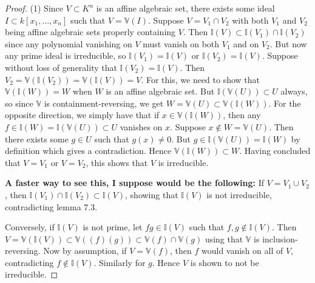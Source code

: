 \documentclass[reqno]{amsart}
\theoremstyle{definition}
\theoremstyle{remark}
\begin{document}
    \begin{proof}
        (1) Since $V \subset K^{n}$ is an affine
        algebraic set, there exists
        some ideal $I \subset k\left[ x_1, \ldots,
        x_n\right] $ such that
        $V = \mathbb{V}(I)$.
        Suppose
        $V = V_1 \cap V_2$ with
        both $V_1$ and $V_2$ being affine
        algebraic sets properly containing
        $V$.
        Then
        $\mathbb{I}(V) \subset 
        \mathbb{I}(V_1) \cap \mathbb{I}(V_2)$ since
        any polynomial vanishing on $V$ must vanish on
        both $V_1$ and on $V_2$. But now any
        prime ideal is irreducible, so
        $\mathbb{I}(V_1) = \mathbb{I}(V)$  or
        $\mathbb{I}(V_2) = \mathbb{I}(V)$.
        Suppose without loss
        of generality that
        $\mathbb{I}(V_2) = \mathbb{I}(V)$. Then
        $V_2 = \mathbb{V} (\mathbb{I}(V_2)) = 
        \mathbb{V} (\mathbb{I}(V)) = V$.
        For this, we need to show that
        $\mathbb{V} \left( \mathbb{I} (W) \right) 
        = W$ when $W$ is an affine algebraic set.
        But $\mathbb{I} \left( \mathbb{V}(U) \right) 
        \subset U$ always, so since
        $\mathbb{V}$ is containment-reversing, we get
        $W = \mathbb{V}(U) \subset 
        \mathbb{V} \left( \mathbb{I} (W) \right) $.
        For the opposite direction, we simply have
        that if
        $x \in \mathbb{V} \left( \mathbb{I}(W) \right) $, then
        any $f \in \mathbb{I}(W)
        = \mathbb{I}\left( \mathbb{V}(U) \right)
        \subset U$ vanishes on
        $x$. Suppose
        $x \not\in W = \mathbb{V}(U)$.
        Then there exists some $g \in U$ such that
        $g(x) \neq 0$. But 
        $g \in \mathbb{I} \left( \mathbb{V}
        (U) \right) = \mathbb{I}(W)$ by definition
        which gives a contradiction.
        Hence
        $\mathbb{V}\left( \mathbb{I}(W) \right) 
        \subset W$.
        Having concluded that
        $V = V_1$ or $V = V_2$, this shows that
        $V$ is irreducible.\\
        \linebreak

        \textbf{A faster way to see this, I suppose
        would be the following:}
        If $V = V_1 \cup  V_2$, then
        $\mathbb{I}(V_1) \cap
        \mathbb{I}(V_2) \subset 
        \mathbb{I}(V)$, showing that 
        $\mathbb{I}(V)$ is not irreducible, contradicting
        lemma 7.3.\\
        \linebreak
        
        Conversely, if
        $\mathbb{I}(V)$ is not prime, let
        $fg \in \mathbb{I}(V)$ such that
        $f,g \not\in \mathbb{I}(V)$.
        Then
        $V = 
        \mathbb{V} \left( \mathbb{I}(V) \right) 
        \subset \mathbb{V}
        \left( (f) (g) \right) 
        \subset \mathbb{V}(f) \cap
        \mathbb{V}(g)$ using that
        $\mathbb{V}$ is inclusion-reversing. 
        Now by assumption,
        if $V = \mathbb{V}(f)$, then
        $f$ would vanish on all of $V$, contradicting
        $f \not\in \mathbb{I}(V)$. Similarly for
        $g$. Hence
        $V$ is shown to not be irreducible.






\end{proof}
\end{document}

